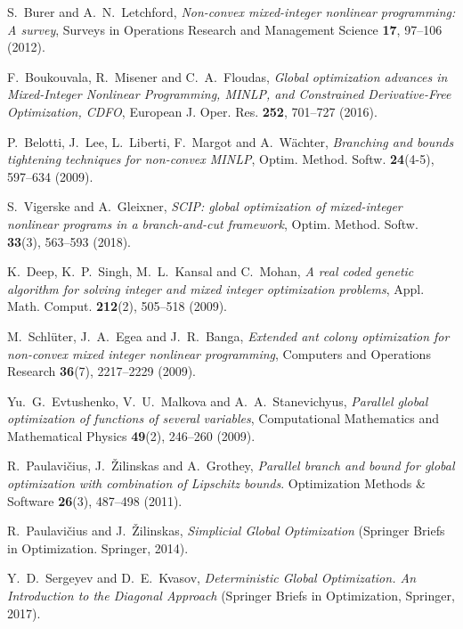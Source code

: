 \documentclass[
11pt,%
tightenlines,%
twoside,%
onecolumn,%
nofloats,%
nobibnotes,%
nofootinbib,%
superscriptaddress,%
noshowpacs,%
centertags]%
{revtex4}
\begin{document}
%
%

\begin{thebibliography}{99}

S.~Burer and A.~N.~Letchford, \textit{Non-convex mixed-integer nonlinear programming: A survey}, Surveys in Operations Research and Management Science \textbf{17}, 97--106 (2012).

F.~Boukouvala, R.~Misener and C.~A.~Floudas, \textit{Global optimization advances in Mixed-Integer Nonlinear Programming, MINLP, and Constrained Derivative-Free Optimization, CDFO}, European J. Oper. Res. \textbf{252}, 701--727 (2016).

P.~Belotti, J.~Lee, L.~Liberti, F.~Margot and A.~W\"achter, \textit{Branching and bounds tightening techniques for non-convex MINLP}, Optim. Method. Softw. \textbf{24}(4-5), 597--634 (2009).

S.~Vigerske and A.~Gleixner, \textit{SCIP: global optimization of mixed-integer nonlinear programs in a branch-and-cut framework}, Optim. Method. Softw. \textbf{33}(3), 563--593 (2018).

K.~Deep, K.~P.~Singh, M.~L.~Kansal and C.~Mohan, \textit{A real coded genetic algorithm for solving integer and mixed integer optimization problems}, Appl. Math. Comput. \textbf{212}(2), 505--518 (2009).

M.~Schl\"uter, J.~A.~Egea and J.~R.~Banga, \textit{Extended ant colony optimization for non-convex mixed integer nonlinear programming}, Computers and Operations Research \textbf{36}(7), 2217--2229 (2009).

Yu.~G.~Evtushenko, V.~U.~Malkova and A.~A.~Stanevichyus, \textit{Parallel global optimization of functions of several variables}, Computational Mathematics and Mathematical Physics \textbf{49}(2), 246--260 (2009).

R.~Paulavi\v{c}ius, J.~\v{Z}ilinskas and A.~Grothey, \textit{Parallel branch and bound for global optimization with combination of Lipschitz bounds}. Optimization Methods \& Software \textbf{26}(3), 487--498 (2011).

R.~Paulavi\v{c}ius and J.~\v{Z}ilinskas, \textit{Simplicial Global Optimization} (Springer Briefs in Optimization. Springer, 2014).

Y.~D.~Sergeyev and D.~E.~Kvasov, \textit{Deterministic Global Optimization. An Introduction to the Diagonal Approach}  (Springer Briefs in Optimization, Springer, 2017).



\end{thebibliography}
\end{document}
